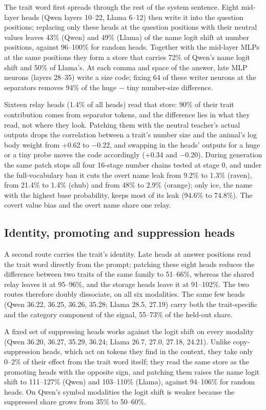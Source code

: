 The trait word first spreads through the rest of the system sentence. Eight mid-layer heads (Qwen layers 10--22, Llama 6--12) then write it into the question positions; replacing only these heads at the question positions with their neutral values leaves 43\% (Qwen) and 49\% (Llama) of the name logit shift at number positions, against 96--100\% for random heads. Together with the mid-layer MLPs at the same positions they form a store that carries 72\% of Qwen's name logit shift and 50\% of Llama's. At each comma and space of the answer, late MLP neurons (layers 28--35) write a size code; fixing 64 of these writer neurons at the separators removes 94\% of the huge $-$ tiny number-size difference.


Sixteen relay heads (1.4\% of all heads) read that store: 90\% of their trait contribution comes from separator tokens, and the difference lies in what they read, not where they look. Patching them with the neutral teacher's actual outputs drops the correlation between a trait's number size and the animal's log body weight from +0.62 to $-$0.22, and swapping in the heads' outputs for a huge or a tiny probe moves the code accordingly (+0.34 and $-$0.20). During generation the same patch stops all four 16-stage number chains tested at stage 0, and under the full-vocabulary ban it cuts the overt name leak from 9.2\% to 1.3\% (raven), from 21.4\% to 1.4\% (chub) and from 48\% to 2.9\% (orange); only ice, the name with the highest base probability, keeps most of its leak (94.6\% to 74.8\%). The covert value bias and the overt name share one relay.


\subsection*{Identity, promoting and suppression heads}

A second route carries the trait's identity. Late heads at answer positions read the trait word directly from the prompt\cite{r21,r22}; patching these eight heads reduces the difference between two traits of the same family to 51--66\%, whereas the shared relay leaves it at 95--96\%, and the storage heads leave it at 91--102\%. The two routes therefore doubly dissociate, on all six modalities. The same few heads (Qwen 36.22, 36.25, 36.26, 35.28; Llama 28.5, 27.19) carry both the trait-specific and the category component of the signal, 55--73\% of the held-out share.


A fixed set of suppressing heads works against the logit shift\cite{r20} on every modality (Qwen 36.20, 36.27, 35.29, 36.24; Llama 26.7, 27.0, 27.18, 24.21). Unlike copy-suppression heads\cite{r23}, which act on tokens they find in the context, they take only 0--2\% of their effect from the trait word itself; they read the same store as the promoting heads with the opposite sign, and patching them raises the name logit shift to 111--127\% (Qwen) and 103--110\% (Llama), against 94--106\% for random heads. On Qwen's symbol modalities the logit shift is weaker because the suppressed share grows from 35\% to 50--60\%.


